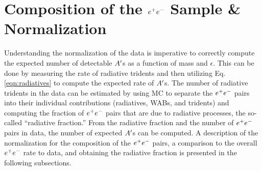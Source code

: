 


\clearpage

\section{Composition of the $e^{+}e^{-}$ Sample \& Normalization}\label{sec:data}

Understanding the normalization of the data is imperative to correctly compute the expected number of detectable $A^\prime$s as a function of mass and $\epsilon$. This can be done by measuring the rate of radiative tridents and then utilizing Eq. \ref{eqn:radiatives} to compute the expected rate of $A^\prime$s. The number of radiative tridents in the data can be estimated by using MC to separate the $e^{+}e^{-}$ pairs into their individual contributions (radiatives, WABs, and tridents) and computing the fraction of $e^{+}e^{-}$ pairs that are due to radiative processes, the so-called ``radiative fraction.'' From the radiative fraction and the number of $e^{+}e^{-}$ pairs in data, the number of expected $A^\prime$s can be computed. A description of the normalization for the composition of the $e^{+}e^{-}$ pairs, a comparison to the overall $e^{+}e^{-}$ rate to data, and obtaining the radiative fraction is presented in the following subsections.



